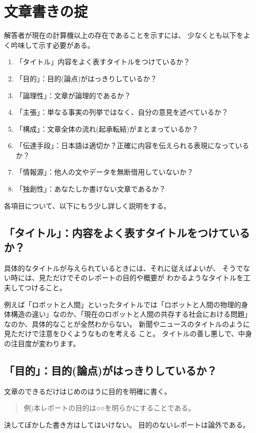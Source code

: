 \documentclass[12pt]{jarticle}
\begin{document}
\section{文章書きの掟}

解答者が現在の計算機以上の存在であることを示すには、
少なくとも以下をよく吟味して示す必要がある。

\begin{enumerate}
\item 「タイトル」内容をよく表すタイトルをつけているか？
\item 「目的」：目的(論点)がはっきりしているか？
\item 「論理性」：文章が論理的であるか？
\item 「主張」：単なる事実の列挙ではなく、自分の意見を述べているか？
\item 「構成」：文章全体の流れ(起承転結)がまとまっているか？
\item 「伝達手段」：日本語は適切か？正確に内容を伝えられる表現になっているか？
\item 「情報源」：他人の文やデータを無断借用していないか？
\item 「独創性」：あなたしか書けない文章であるか？
\end{enumerate}
各項目について、以下にもう少し詳しく説明をする。

\subsection{「タイトル」：内容をよく表すタイトルをつけているか？}

具体的なタイトルが与えられているときには、それに従えばよいが、
そうでない時には、見ただけでそのレポートの目的や概要が
わかるようなタイトルを工夫してつけること。

例えば「ロボットと人間」といったタイトルでは「ロボットと人間の物理的身
体構造の違い」なのか、「現在のロボットと人間の共存する社会における問題」
なのか、具体的なことが全然わからない。
新聞やニュースのタイトルのように見ただけで注意をひくようなものを考える
こと。
タイトルの善し悪しで、中身の注目度が変わります。


\subsection{「目的」：目的(論点)がはっきりしているか？}

文章のできるだけはじめのほうに目的を明確に書く。
\begin{quote}
  例)本レポートの目的は○○を明らかにすることである。
\end{quote}
決してぼかした書き方はしてはいけない。
目的のないレポートは論外である。
\end{document}
